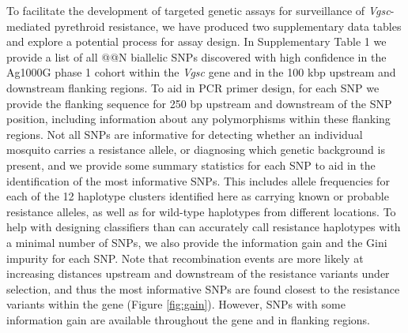 \documentclass[a4paper,11pt,abstracton,hidelinks]{scrartcl}
\begin{document}
%
To facilitate the development of targeted genetic assays for surveillance of \textit{Vgsc}-mediated pyrethroid resistance, we have produced two supplementary data tables and explore a potential process for assay design.
%
In Supplementary Table 1 we provide a list of all @@N biallelic SNPs discovered with high confidence in the Ag1000G phase 1 cohort within the \textit{Vgsc} gene and in the 100 kbp upstream and downstream flanking regions.
%
To aid in PCR primer design, for each SNP we provide the flanking sequence for 250 bp upstream and downstream of the SNP position, including information about any polymorphisms within these flanking regions.
%
Not all SNPs are informative for detecting whether an individual mosquito carries a resistance allele, or diagnosing which genetic background is present, and we provide some summary statistics for each SNP to aid in the identification of the most informative SNPs.
%
This includes allele frequencies for each of the 12 haplotype clusters identified here as carrying known or probable resistance alleles, as well as for wild-type haplotypes from different locations.
%
To help with designing classifiers than can accurately call resistance haplotypes with a minimal number of SNPs, we also provide the information gain \cite{Quinlan1986} and the Gini impurity \cite{Breiman1984} for each SNP.
%
Note that recombination events are more likely at increasing distances upstream and downstream of the resistance variants under selection, and thus the most informative SNPs are found closest to the resistance variants within the gene (Figure \ref{fig:gain}).
%
However, SNPs with some information gain are available throughout the gene and in flanking regions.
%
\end{document}
